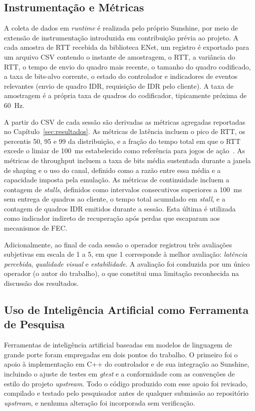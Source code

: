 \subsection{Instrumentação e Métricas}

A coleta de dados em \emph{runtime} é realizada pelo próprio
Sunshine, por meio de extensão de instrumentação introduzida em
contribuição prévia ao projeto. A cada amostra de RTT recebida
da biblioteca ENet, um registro é exportado para um arquivo
CSV contendo o instante de amostragem, o RTT, a variância do
RTT, o tempo de envio do quadro mais recente, o tamanho do
quadro codificado, a taxa de bits-alvo corrente, o estado do
controlador e indicadores de eventos relevantes (envio de
quadro IDR, requisição de IDR pelo cliente). A taxa de
amostragem é a própria taxa de quadros do codificador,
tipicamente próxima de \SI{60}{\hertz}.

A partir do CSV de cada sessão são derivadas as métricas
agregadas reportadas no Capítulo~\ref{sec:resultados}. As
métricas de latência incluem o pico de RTT, os percentis 50,
95 e 99 da distribuição, e a fração do tempo total em que o
RTT excede o limiar de \SI{100}{\milli\second} estabelecido
como referência para jogos de ação~\cite{baldovino2022}. As
métricas de throughput incluem a taxa de bits média sustentada
durante a janela de shaping e o uso do canal, definido como a
razão entre essa média e a capacidade imposta pela emulação.
As métricas de continuidade incluem a contagem de \emph{stalls},
definidos como intervalos consecutivos superiores a
\SI{100}{\milli\second} sem entrega de quadros ao cliente, o
tempo total acumulado em \emph{stall}, e a contagem de quadros
IDR emitidos durante a sessão. Esta última é utilizada como
indicador indireto de recuperação após perdas que escaparam aos
mecanismos de FEC.

Adicionalmente, ao final de cada sessão o operador registrou
três avaliações subjetivas em escala de 1 a 5, em que 1
corresponde à melhor avaliação: \emph{latência percebida},
\emph{qualidade visual} e \emph{estabilidade}. A avaliação foi
conduzida por um único operador (o autor do trabalho), o que
constitui uma limitação reconhecida na discussão dos
resultados.

\subsection{Uso de Inteligência Artificial como Ferramenta de Pesquisa}

Ferramentas de inteligência artificial baseadas em modelos de
linguagem de grande porte foram empregadas em dois pontos do
trabalho. O primeiro foi o apoio à implementação em C++ do
controlador e de sua integração ao Sunshine, incluindo o
ajuste de testes em \emph{gtest} e a conformidade com as
convenções de estilo do projeto \emph{upstream}. Todo o código
produzido com esse apoio foi revisado, compilado e testado pelo
pesquisador antes de qualquer submissão ao repositório
\emph{upstream}, e nenhuma alteração foi incorporada sem
verificação.

